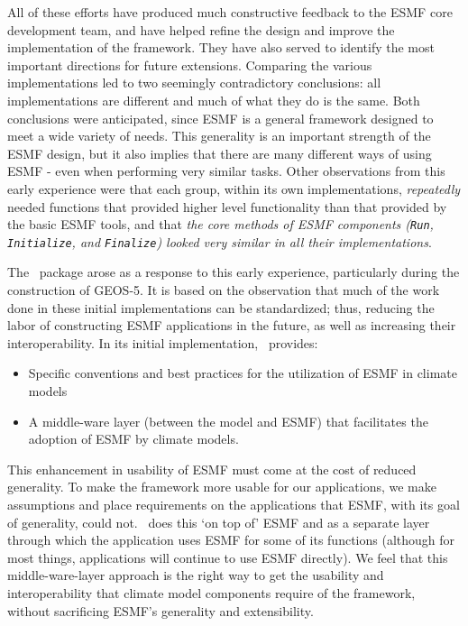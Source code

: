 All of these efforts have produced much constructive feedback to the
ESMF core development team, and have helped refine the design and
improve the implementation of the framework. They have also served to
identify the most important directions for future extensions.
Comparing the various implementations led to two seemingly
contradictory conclusions: all implementations are different and
much of what they do is the same.  Both conclusions were
anticipated, since ESMF is a general framework designed to meet a wide
variety of needs.  This generality is an important strength of the
ESMF design, but it also implies that there are many different ways of
using ESMF - even when performing very similar tasks. Other
observations from this early experience were that each group, within
its own implementations, \emph{repeatedly} needed functions that provided
higher level functionality than that provided by the basic ESMF tools,
and that \emph{the core methods of ESMF components ({\tt Run}, 
{\tt Initialize}, and {\tt Finalize}) looked very similar in all
their implementations}.

The \ggn\ package arose as a response to this early
experience, particularly during the construction of GEOS-5.
It is based on the observation that much of the work done in these initial
implementations can be standardized; thus, reducing the labor of
constructing ESMF applications in the future, as well as increasing
their interoperability. In its initial implementation, \ggn\  
provides:
%
\begin{itemize}
\item Specific conventions and best practices for the utilization 
of ESMF in climate models
\item  A middle-ware layer (between the model and ESMF) that
facilitates the adoption of ESMF by climate models.
\end{itemize}

This enhancement in usability of ESMF must come at the cost of reduced
generality. To make the framework more usable for our applications, we
make assumptions and place requirements on the applications that ESMF,
with its goal of generality, could not. \ggn\ does this 
`on top of' ESMF and as a separate layer through which the
application uses ESMF for some of its functions (although for most
things, applications will continue to use ESMF directly). We feel that
this middle-ware-layer approach is the right way to get the usability
and interoperability that climate model components require of the
framework, without sacrificing ESMF's generality and extensibility.

